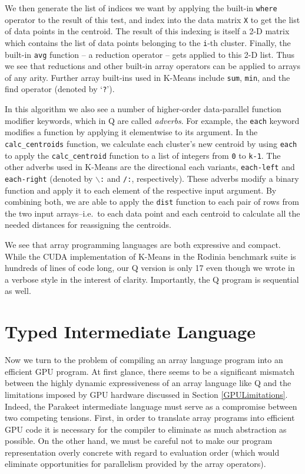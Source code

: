 \documentclass[preprint]{sigplanconf}
\begin{document}
We then generate the list of indices we want by applying the built-in \texttt{where} operator to the result of this test, and index into the data matrix \texttt{X} to get the list of data points in the centroid. The result of this indexing is itself a 2-D matrix which contains the list of data points belonging to the \texttt{i}-th cluster. Finally, the built-in \texttt{avg} function -- a reduction operator -- gets applied to this 2-D list. Thus we see that reductions and other built-in array operators can be applied to arrays of any arity.  Further array built-ins used in K-Means include \texttt{sum}, \texttt{min}, and the find operator (denoted by `\texttt{?}').

In this algorithm we also see a number of higher-order data-parallel function modifier keywords, which in Q are called \emph{adverbs}.  For example, the \texttt{each} keyword modifies a function by applying it elementwise to its argument.  In the \texttt{calc\_centroids} function, we calculate each cluster's
new centroid by using \texttt{each} to apply the \texttt{calc\_centroid} function to a list of integers from \texttt{0} to \texttt{k-1}.  The other adverbs used in K-Means are the directional each variants, \texttt{each-left} and \texttt{each-right} (denoted by \texttt{$\backslash$:} and  \texttt{/:}, respectively). These adverbs modify a binary function and apply it to each element of the respective input argument.  By combining both, we are able to apply the \texttt{dist} function to each pair of rows from the two input arrays--i.e.~to each data point and each centroid to calculate all the needed distances for reassigning the centroids.

We see that array programming languages are both expressive and compact.  While the CUDA implementation of K-Means in the Rodinia benchmark suite is hundreds of lines of code long, our Q version is only 17 even though we wrote in a verbose style in the interest of clarity. Importantly, the Q program is sequential as well.

\section{Typed Intermediate Language}
Now we turn to the problem of compiling an array language program into an efficient GPU program. At first glance, there seems to be a significant mismatch between the highly dynamic expressiveness of an array language like Q and the limitations imposed by GPU hardware discussed in Section \ref{GPULimitations}. Indeed, the Parakeet intermediate language must serve as a compromise between two competing tensions. First, in order to translate array programs into efficient GPU code it is necessary for the compiler to eliminate as much abstraction as possible. On the other hand, we must be careful not to make our program representation overly concrete with regard to evaluation order (which would eliminate opportunities for parallelism provided by the array operators).
\end{document}
